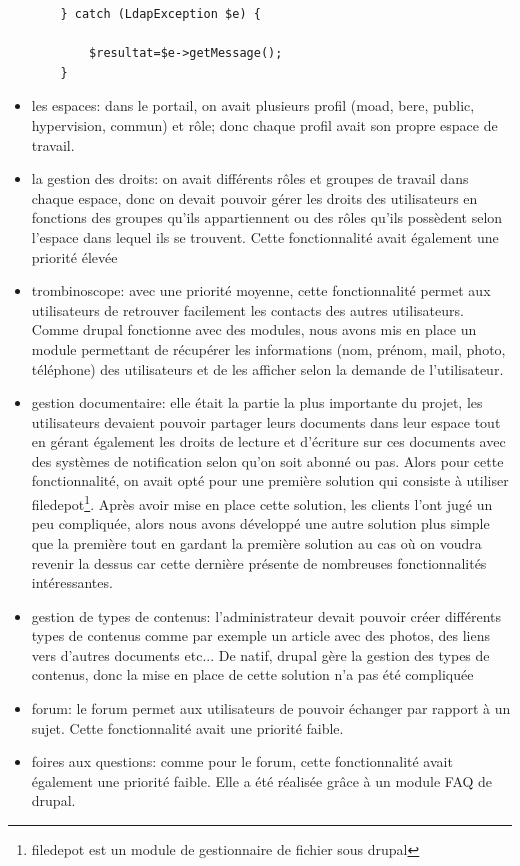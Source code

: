 \begin{itemize}
\begin{lstlisting}
	} catch (LdapException $e) {
	 
		$resultat=$e->getMessage();
	}
\end{lstlisting}
\item les espaces: dans le portail, on avait plusieurs profil (moad, bere, public, hypervision, commun) et rôle; donc chaque profil avait son propre espace de travail.
\item la gestion des droits: on avait différents rôles et groupes de travail dans chaque espace, donc on devait pouvoir gérer les droits des utilisateurs en fonctions des groupes qu'ils appartiennent ou des rôles qu'ils possèdent selon l'espace dans lequel ils se trouvent. Cette fonctionnalité avait également une priorité élevée  
\item trombinoscope: avec une priorité moyenne, cette fonctionnalité permet aux utilisateurs de retrouver facilement les contacts des autres utilisateurs. Comme drupal fonctionne avec des modules, nous avons mis en place un module permettant de récupérer les informations (nom, prénom, mail, photo, téléphone) des utilisateurs et de les afficher selon la demande de l'utilisateur.
\item gestion documentaire: elle était la partie la plus importante du projet, les utilisateurs devaient pouvoir partager leurs documents dans leur espace tout en gérant également les droits de lecture et d'écriture sur ces documents avec des systèmes de notification selon qu'on soit abonné ou pas. Alors pour cette fonctionnalité, on avait opté pour une première solution qui consiste à utiliser filedepot\footnote{filedepot est un module de gestionnaire de fichier sous drupal}. Après avoir mise en place cette solution, les clients l'ont jugé un peu compliquée, alors nous avons développé une autre solution plus simple que la première tout en gardant la première solution au cas où on voudra revenir la dessus car cette dernière présente de nombreuses fonctionnalités intéressantes.
\item gestion de types de contenus: l'administrateur devait pouvoir créer différents types de contenus comme par exemple un article avec des photos, des liens vers d'autres documents etc... De natif, drupal gère la gestion des types de contenus, donc la mise en place de cette solution n'a pas été compliquée
\item forum: le forum permet aux utilisateurs de pouvoir échanger par rapport à un sujet. Cette fonctionnalité avait une priorité faible. 
\item foires aux questions: comme pour le forum, cette fonctionnalité avait également une priorité faible. Elle a été réalisée grâce à un module FAQ de drupal.

\end{itemize}
